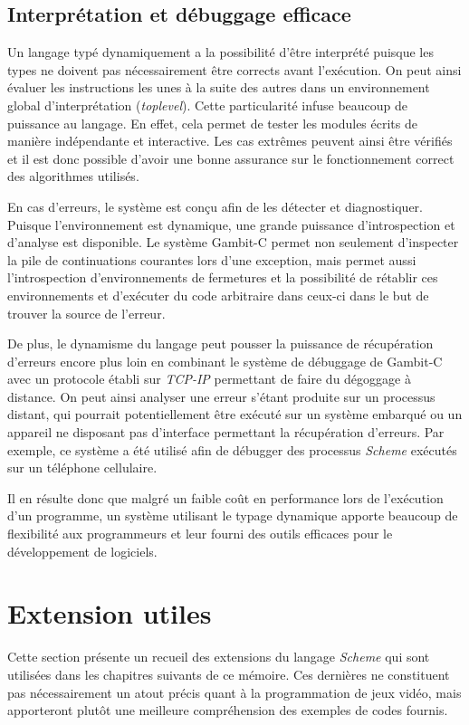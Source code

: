 \documentclass[12pt,twoside,letterpaper,francais]{book}
\newcommand{\Schemelang}{{\textit{Scheme }}}
\begin{document}
\FloatBarrier
\subsection{Interprétation et débuggage efficace}
Un langage typé dynamiquement a la possibilité d'être interprété
puisque les types ne doivent pas nécessairement être corrects avant
l'exécution. On peut ainsi évaluer les instructions les unes à la
suite des autres dans un environnement global d'interprétation
(\textit{toplevel}). Cette particularité infuse beaucoup de puissance
au langage. En effet, cela permet de tester les modules écrits de
manière indépendante et interactive. Les cas extrêmes peuvent ainsi
être vérifiés et il est donc possible d'avoir une bonne assurance sur
le fonctionnement correct des algorithmes utilisés.

En cas d'erreurs, le système est conçu afin de les détecter et
diagnostiquer. Puisque l'environnement est dynamique, une grande
puissance d'introspection et d'analyse est disponible. Le système
Gambit-C permet non seulement d'inspecter la pile de continuations
courantes lors d'une exception, mais permet aussi l'introspection
d'environnements de fermetures et la possibilité de rétablir ces
environnements et d'exécuter du code arbitraire dans ceux-ci dans le
but de trouver la source de l'erreur.

De plus, le dynamisme du langage peut pousser la puissance de
récupération d'erreurs encore plus loin en combinant le système de
débuggage de Gambit-C avec un protocole établi sur \textit{TCP-IP}
permettant de faire du dégoggage à distance. On peut ainsi analyser
une erreur s'étant produite sur un processus distant, qui pourrait
potentiellement être exécuté sur un système embarqué ou un appareil ne
disposant pas d'interface permettant la récupération d'erreurs. Par
exemple, ce système a été utilisé afin de débugger des processus
\Schemelang exécutés sur un téléphone cellulaire.

Il en résulte donc que malgré un faible coût en performance lors de
l'exécution d'un programme, un système utilisant le typage dynamique
apporte beaucoup de flexibilité aux programmeurs et leur fourni des
outils efficaces pour le développement de logiciels.



\FloatBarrier
\section{Extension utiles}
Cette section présente un recueil des extensions du langage
\Schemelang qui sont utilisées dans les chapitres suivants de ce
mémoire. Ces dernières ne constituent pas nécessairement un atout
précis quant à la programmation de jeux vidéo, mais apporteront plutôt
une meilleure compréhension des exemples de codes fournis.
\end{document}
